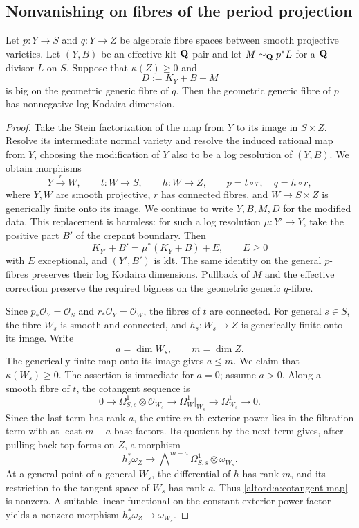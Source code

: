 \subsection{Nonvanishing on fibres of the period projection}

\begin{lemma}\label{altord:a:period-fibre}
Let \(p:Y\to S\) and \(q:Y\to Z\) be algebraic fibre spaces between
smooth projective varieties.  Let \((Y,B)\) be an effective klt
\(\mathbf Q\)-pair and let \(M\sim_{\mathbf Q}p^*L\) for a \(\mathbf Q\)-divisor \(L\) on
\(S\).  Suppose that \(\kappa(Z)\geq0\) and
\[
 D:=K_Y+B+M
\]
is big on the geometric generic fibre of \(q\).
Then the geometric generic fibre of \(p\) has nonnegative log
Kodaira dimension.
\end{lemma}

\begin{proof}
Take the Stein factorization of the map from \(Y\) to its image in
\(S\times Z\).  Resolve its intermediate normal variety and resolve
the induced rational map from \(Y\), choosing the modification of \(Y\)
also to be a log resolution of \((Y,B)\). We obtain morphisms
\[
 Y\xrightarrow{r}W,\qquad t:W\to S,\qquad h:W\to Z,
 \qquad p=t\circ r,\quad q=h\circ r,
\]
where \(Y,W\) are smooth projective, \(r\) has connected fibres, and
\(W\to S\times Z\) is generically finite onto its image.
We continue to write \(Y,B,M,D\) for the modified data.
This replacement is harmless: for such a log resolution
\(\mu:Y'\to Y\), take the positive part \(B'\) of the crepant
boundary.  Then
\[
 K_{Y'}+B'=\mu^*(K_Y+B)+E,\qquad E\geq0
\]
with \(E\) exceptional, and \((Y',B')\) is klt.
The same identity on the general \(p\)-fibres preserves their log
Kodaira dimensions.  Pullback of \(M\) and the effective correction
preserve the required bigness on the geometric generic \(q\)-fibre.

Since \(p_*\mathcal O_Y=\mathcal O_S\) and
\(r_*\mathcal O_Y=\mathcal O_W\), the fibres of \(t\) are connected.
For general \(s\in S\), the fibre \(W_s\) is smooth and connected,
and \(h_s:W_s\to Z\) is generically finite onto its image.  Write
\[
 a=\dim W_s,\qquad m=\dim Z.
\]
The generically finite map onto its image gives $a\leq m$.
We claim that \(\kappa(W_s)\geq0\).  The assertion is immediate for
\(a=0\); assume \(a>0\).  Along a smooth fibre of \(t\), the cotangent
sequence is
\[
 0\longrightarrow \Omega^1_{S,s}\otimes\mathcal O_{W_s}
 \longrightarrow \Omega^1_W|_{W_s}
 \longrightarrow \Omega^1_{W_s}\longrightarrow0.
\]
Since the last term has rank \(a\), the entire \(m\)-th exterior
power lies in the filtration term with at least \(m-a\) base
factors.  Its quotient by the next term gives, after pulling back
top forms on \(Z\), a morphism
\begin{equation}\label{altord:a:cotangent-map}
 h_s^*\omega_Z\longrightarrow
 \bigwedge\nolimits^{m-a}\Omega^1_{S,s}\otimes\omega_{W_s}.
\end{equation}
At a general point of a general \(W_s\), the differential of \(h\)
has rank \(m\), and its restriction to the tangent space of \(W_s\)
has rank \(a\).  Thus \eqref{altord:a:cotangent-map} is nonzero.  A suitable
linear functional on the constant exterior-power factor yields a
nonzero morphism \(h_s^*\omega_Z\to\omega_{W_s}\).


\end{proof}
